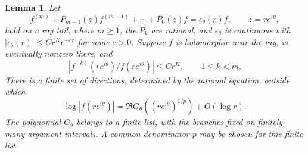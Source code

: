 \documentclass[a4paper,12pt]{article}
\newtheorem{lemma}[defin]{Lemma}
\numberwithin{equation}{section}
\begin{document}
\begin{lemma}\label{lem.ray.comparison}
Let
\[
 f^{(m)}+P_{m-1}(z)f^{(m-1)}+\cdots+P_0(z)f
=\epsilon_\theta(r)f,\qquad z=re^{i\theta},
\]
hold on a ray tail, where $m\ge1$, the $P_k$ are rational, and
$\epsilon_\theta$ is continuous with
$|\epsilon_\theta(r)|\le Cr^K e^{-cr}$ for some $c>0$.
Suppose $f$ is holomorphic near the ray, is eventually nonzero there, and
\[
 |f^{(k)}(re^{i\theta})/f(re^{i\theta})|\le Cr^K,
 \qquad 1\le k<m.
\]
There is a finite set of directions, determined by the rational equation,
outside which
\begin{equation}\label{eq.log|f|.sector}
 \log|f(re^{i\theta})|=\Re G_\theta((re^{i\theta})^{1/p})
                         +O(\log r).
\end{equation}
The polynomial $G_\theta$ belongs to a finite list, with the branches fixed
on finitely many argument intervals. A common denominator $p$ may be
chosen for this finite list.
\end{lemma}
\end{document}
